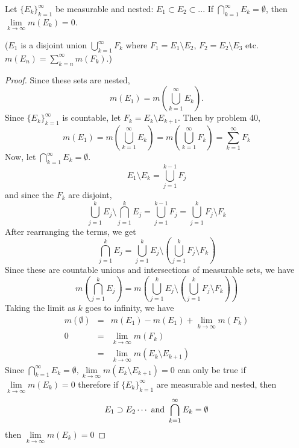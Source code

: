 \begin{pblm}\label{p:osouseful}%
	Let $\{E_k\}_{k=1}^\infty$ be measurable and nested: $E_1 \subset E_2 
	\subset ... $ If $\bigcap\limits_{k=1}^\infty E_k = \emptyset$, then 
	$\lim\limits_{k\to\infty} m(E_k) = 0$. 

	($E_1$ is a disjoint union $\bigcup\limits_{k=1}^\infty F_k$ where 
	$F_1 = E_1 \setminus E_2$, $F_2 = E_2 \setminus E_3$ etc. 
	$m(E_n) = \sum\limits_{k=n}^\infty m(F_k)$.)
\begin{proof}
	Since these sets are nested, 
	\begin{equation*}
		m(E_1)= m(\bigcup_{k=1}^\infty E_k). 
	\end{equation*}
	Since $\{E_k\}_{k=1}^\infty$ is countable, let $F_k = E_k\setminus E_{k+1}$. 
	Then by problem 40, 
	\begin{equation*}
	m(E_1)=m(\bigcup_{k=1}^\infty E_k)=m(\bigcup_{k=1}^\infty F_k) = \sum_{k=1}^\infty F_k
	\end{equation*}
	Now, let $\bigcap _{k=1}^\infty E_k =\emptyset$.
	\begin{equation*}
		E_1\setminus E_k = \bigcup_{j=1}^{k-1} F_j
	\end{equation*}
	and since the $F_k$ are disjoint, 
	\begin{equation*}
		\bigcup_{j=1}^k E_j\setminus\bigcap_{j=1}^{k}E_j = \bigcup_{j=1}^{k-1} F_j=\bigcup_{j=1}^{k} F_j\setminus F_k
	\end{equation*}
	After rearranging the terms, we get 
	\begin{equation*}
		\bigcap_{j=1}^{k}E_j = \bigcup_{j=1}^k E_j\setminus\left(\bigcup_{j=1}^{k} F_j\setminus F_k \right)
	\end{equation*}
	Since these are countable unions and intersections of measurable sets, we have 
	\begin{equation*}
		m\left(\bigcap_{j=1}^{k}E_j\right) = m\left(\bigcup_{j=1}^k E_j\setminus\left(\bigcup_{j=1}^{k} F_j\setminus F_k \right)\right)
	\end{equation*}
	Taking the limit as $k$ goes to infinity, we have 
	\begin{equation*}
	\begin{array}{rcl}
		m(\emptyset) &=& m(E_1) - m(E_1) + \lim\limits_{k\to\infty}m(F_k)\\
		0 &=& \lim\limits_{k\to\infty}m(F_k)  \\
		& = & \lim\limits_{k\to\infty}m(E_k\setminus E_{k+1})
	\end{array}
	\end{equation*}
	Since $\bigcap _{k=1}^\infty E_k =\emptyset, \lim\limits_{k\to\infty}m(E_k\setminus E_{k+1}) =0$ 
	can only be true if $\lim\limits_{k\to\infty}m(E_k) = 0$ 
	therefore if $\{E_k\}_{k=1}^\infty$ are measurable and nested, then 
	\begin{equation*}
		E_1 \supset E_2 \cdots \textnormal{ and }\bigcap _{k=1}^\infty E_k =\emptyset
	\end{equation*} 
	then $\lim\limits_{k\to \infty} m(E_k) = 0$
\end{proof}
\end{pblm}

